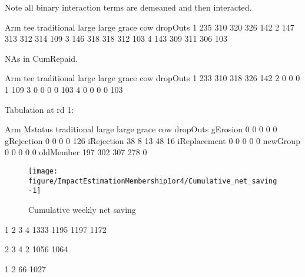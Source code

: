 Note all binary interaction terms are demeaned and then interacted.
\begin{Schunk}
\begin{Soutput}
   Arm
tee traditional large large grace cow dropOuts
  1         235   310         320 326      142
  2         147   313         312 314      109
  3         146   318         318 312      103
  4         143   309         311 306      103
\end{Soutput}
\end{Schunk}
NAs in \textsf{CumRepaid}.
\begin{Schunk}
\begin{Soutput}
   Arm
tee traditional large large grace cow dropOuts
  1         233   310         318 326      142
  2           0     0           0   1      109
  3           0     0           0   0      103
  4           0     0           0   0      103
\end{Soutput}
\end{Schunk}
Tabulation at rd 1:
\begin{Schunk}
\begin{Soutput}
              Arm
Mstatus        traditional large large grace cow dropOuts
  gErosion               0     0           0   0        0
  gRejection             0     0           0   0      126
  iRejection            38     8          13  48       16
  iReplacement           0     0           0   0        0
  newGroup               0     0           0   0        0
  oldMember            197   302         307 278        0
\end{Soutput}
\end{Schunk}
\begin{Schunk}
\begin{figure}

{\centering \texttt{[image: figure/ImpactEstimationMembership1or4/Cumulative\_net\_saving-1]} 

}

\caption[Cumulative weekly net saving]{Cumulative weekly net saving}\label{Figure Cumulative net saving}
\end{figure}
\end{Schunk}
\begin{Schunk}
\begin{Soutput}

   1    2    3    4 
1333 1195 1197 1172 
\end{Soutput}
\begin{Soutput}

   2    3    4 
   2 1056 1064 
\end{Soutput}
\begin{Soutput}

   1    2 
  66 1027 
\end{Soutput}
\end{Schunk}
